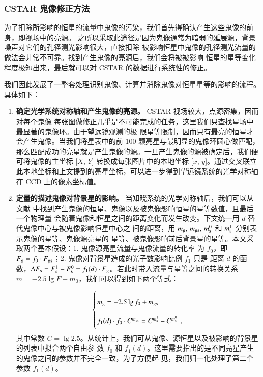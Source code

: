 \subsubsection{CSTAR 鬼像修正方法}

为了扣除所影响的恒星的流量中鬼像的污染，我们首先得确认产生这些鬼像的前身，即视场中的亮源。
之所以采取此途径是因为鬼像通常为暗弱的延展源，背景噪声对它们的孔径测光影响很大，直接扣除
被影响恒星中鬼像的孔径测光流量的做法会非常不可靠。找到产生鬼像的亮源后，我们会将被被影响
恒星的星等变化程度极短出来，最后就可以对 CSTAR 的数据进行系统性的修正。

我们因此发展了一整套处理识别鬼像、计算并消除鬼像对恒星星等的影响的流程。具体如下：

\begin{enumerate}[leftmargin=1\parindent]

\item \textbf{确定光学系统对称轴和产生鬼像的亮源。} CSTAR 视场较大，点源密集，因而对每个鬼像
每张图做修正几乎是不可能完成的任务，这里我们只查找星场中最显著的鬼像环。由于望远镜观测的极
限星等限制，因而只有最亮的恒星才会产生鬼像。当我们将星表中的前 100 颗亮星与最明显的鬼像环圆心做匹配，那么匹配成功的亮星就是产生鬼像的源。一旦产生鬼像的源被确定后，我们便可将鬼像的主坐标 [$X$, $Y$] 转换成每张图片中的本地坐标 [$x$, $y$]。通过交叉联立此本地坐标和上文提到的亮星坐标，可以进一步得到望远镜系统的光学对称轴在 CCD 上的像素坐标值。

\item \textbf{定量的描述鬼像对背景星的影响。} 当知晓系统的光学对称轴后，我们可以从文献 
 中找到产生鬼像的恒星、鬼像以及被鬼像影响恒星的星等数值，且最后一个物理量
会随着鬼像和恒星之间的距离变化而发生改变。下文统一用 $d$ 替代鬼像中心与被鬼像影响恒星中心之
间的距离，用 $m_\mathrm{g},\,m_\mathrm{gs},\,m_\mathrm{s}^0$ 和 $m_\mathrm{s}^1$ 分别表示鬼像的星等、鬼像源亮星的
星等、被鬼像影响前后背景星的星等。本文采取两个基本假设：1. 鬼像源亮星流量与鬼像流量的转化率
为 $f_0$，即 $F_{\rm{g}}=f_0\cdot F_{\rm{gs}}$；2. 鬼像对背景星造成的光子数影响比例 $f_1 $ 只是
距离 $d$ 的函数，$\Delta F_{\mathrm{s}}=F_{\mathrm{s}}^1-F_{\mathrm{s}}^0=f_1(d)\cdot F_{\mathrm{g}}$。若此时带入流量与星等之间的转换关系 $m=-2.5\lg F+m_0$，我们可以得到如下两个等式：


\begin{equation} \label{eq:ghostformular}
\arraycolsep=1.4pt\def\arraystretch{2.2}
\left\{
\begin{array}{l}
m_{\tif{g}} = -2.5 \lg f_0 + m_{\tif{gs}} \\
f_1(d) \cdot f_0 \cdot C^{m_{\tif{gs}}} = C^{m^1_{\tif{s}}}-C^{m^0_{\tif{s}}}  \, \ ,
\end{array} 
\right. 
\end{equation} 
其中常数 $C=\lg 2.5$。从统计上，我们可从鬼像、源恒星以及被影响的背景星的列表中拟合两个自由参
数 $f_0$ 和 $f_1(d)$。这里需要指出的是不同亮星产生的鬼像之间的参数并不完全一致，为了方便起
见，我们归一化处理了第二个参数 $f_1(d)$。


\end{enumerate}
